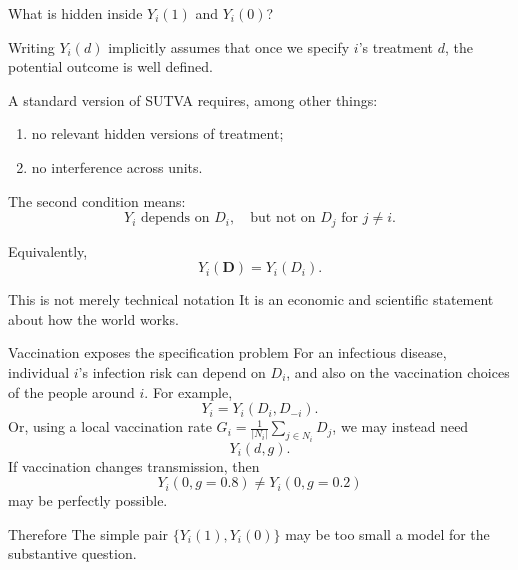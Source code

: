 \documentclass[aspectratio=169,11pt]{beamer}
\begin{document}
\begin{frame}{What is hidden inside $Y_i(1)$ and $Y_i(0)$?}

Writing $Y_i(d)$ implicitly assumes that once we specify $i$'s
treatment $d$, the potential outcome is well defined.

A standard version of SUTVA requires, among other things:

\vspace{0.3em}

\begin{enumerate}
    \item no relevant hidden versions of treatment;
    \item no interference across units.
\end{enumerate}

The second condition means:
\[
Y_i
\text{ depends on } D_i,
\quad
\text{but not on } D_j
\text{ for }j\neq i.
\]

Equivalently,
\[
Y_i(\bm D)
=
Y_i(D_i).
\]

\pause

\vspace{0.25em}

\begin{alertblock}{This is not merely technical notation}
It is an economic and scientific statement about how the world works.
\end{alertblock}

\end{frame}

\begin{frame}{Vaccination exposes the specification problem}
For an infectious disease, individual $i$'s infection risk can depend on $D_i$,
and also on the vaccination choices of the people around $i$. For example,
\[
Y_i = Y_i(D_i,D_{-i}).
\]
Or, using a local vaccination rate $G_i=\frac{1}{|N_i|}\sum_{j\in N_i}D_j$,
we may instead need
\[
\boxed{Y_i(d,g).}
\]
If vaccination changes transmission, then
\[
Y_i(0,g=0.8) \neq Y_i(0,g=0.2)
\]
may be perfectly possible.

\begin{alertblock}{Therefore}
The simple pair $\{Y_i(1),Y_i(0)\}$ may be too small a model for the
substantive question.
\end{alertblock}
\end{frame}
\end{document}

